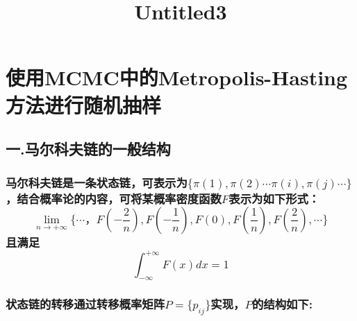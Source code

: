\documentclass[11pt]{article}
\title{Untitled3}
\begin{document}
    
    
    \maketitle
    
    

    
    \section{使用MCMC中的Metropolis-Hasting方法进行随机抽样}\label{ux4f7fux7528mcmcux4e2dux7684metropolis-hastingux65b9ux6cd5ux8fdbux884cux968fux673aux62bdux6837}

    \subsection{一.马尔科夫链的一般结构}\label{ux4e00.ux9a6cux5c14ux79d1ux592bux94feux7684ux4e00ux822cux7ed3ux6784}

\subsubsection{\texorpdfstring{马尔科夫链是一条状态链，可表示为\(\{\pi(1),\pi(2)\cdots \pi(i),\pi(j)\cdots\}\)，结合概率论的内容，可将某概率密度函数\(F\)表示为如下形式：\[\lim_{n\to+\infty}\{\cdots ，F(-\frac{2}{n}),F(-\frac{1}{n}),F(0),F(\frac{1}{n}),F(\frac{2}{n}),\cdots\}\]且满足\[\int_{-\infty}^{+\infty} F(x)dx=1\]}{马尔科夫链是一条状态链，可表示为\textbackslash{}\{\textbackslash{}pi(1),\textbackslash{}pi(2)\textbackslash{}cdots \textbackslash{}pi(i),\textbackslash{}pi(j)\textbackslash{}cdots\textbackslash{}\}，结合概率论的内容，可将某概率密度函数F表示为如下形式：\textbackslash{}lim\_\{n\textbackslash{}to+\textbackslash{}infty\}\textbackslash{}\{\textbackslash{}cdots ，F(-\textbackslash{}frac\{2\}\{n\}),F(-\textbackslash{}frac\{1\}\{n\}),F(0),F(\textbackslash{}frac\{1\}\{n\}),F(\textbackslash{}frac\{2\}\{n\}),\textbackslash{}cdots\textbackslash{}\}且满足\textbackslash{}int\_\{-\textbackslash{}infty\}\^{}\{+\textbackslash{}infty\} F(x)dx=1}}\label{ux9a6cux5c14ux79d1ux592bux94feux662fux4e00ux6761ux72b6ux6001ux94feux53efux8868ux793aux4e3api1pi2cdots-piipijcdotsux7ed3ux5408ux6982ux7387ux8bbaux7684ux5185ux5bb9ux53efux5c06ux67d0ux6982ux7387ux5bc6ux5ea6ux51fdux6570fux8868ux793aux4e3aux5982ux4e0bux5f62ux5f0flim_ntoinftycdots-f-frac2nf-frac1nf0ffrac1nffrac2ncdotsux4e14ux6ee1ux8db3int_-inftyinfty-fxdx1}

\subsubsection{\texorpdfstring{状态链的转移通过转移概率矩阵\(P=\{p_{ij}\}\)实现，\(P\)的结构如下:}{状态链的转移通过转移概率矩阵P=\textbackslash{}\{p\_\{ij\}\textbackslash{}\}实现，P的结构如下:}}\label{ux72b6ux6001ux94feux7684ux8f6cux79fbux901aux8fc7ux8f6cux79fbux6982ux7387ux77e9ux9635pp_ijux5b9eux73b0pux7684ux7ed3ux6784ux5982ux4e0b}
\end{document}

